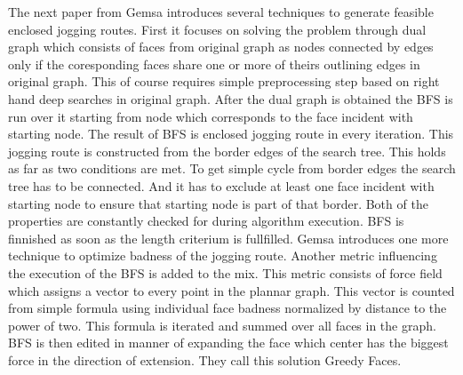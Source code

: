 \documentclass{ctuthesis}
\begin{document}
The next paper from Gemsa \cite{jogging} introduces several techniques to generate feasible enclosed jogging routes. First it focuses on solving the problem through dual graph which consists of faces from original graph as nodes connected by edges only if the coresponding faces share one or more of theirs outlining edges in original graph. This of course requires simple preprocessing step based on right hand deep searches in original graph. After the dual graph is obtained the BFS is run over it starting from node which corresponds to the face incident with starting node. The result of BFS is enclosed jogging route in every iteration. This jogging route is constructed from the border edges of the search tree. This holds as far as two conditions are met. To get simple cycle from border edges the search tree has to be connected. And it has to exclude at least one face incident with starting node to ensure that starting node is part of that border. Both of the properties are constantly checked for during algorithm execution. BFS is finnished as soon as the length criterium is fullfilled. Gemsa introduces one more technique to optimize badness of the jogging route. Another metric influencing the execution of the BFS is added to the mix. This metric consists of force field which assigns a vector to every point in the plannar graph. This vector is counted from simple formula using individual face badness normalized by distance to the power of two. This formula is iterated and summed over all faces in the graph. BFS is then edited in manner of expanding the face which center has the biggest force in the direction of extension. They call this solution Greedy Faces.\par
\end{document}
